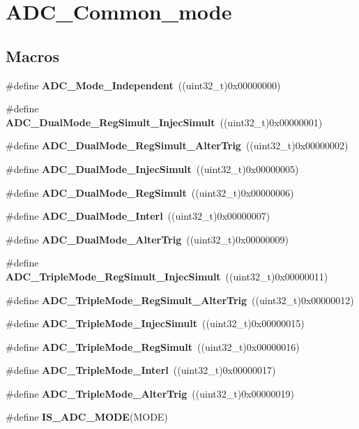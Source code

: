 \section{A\+D\+C\+\_\+\+Common\+\_\+mode}
\label{group__ADC__Common__mode}
\subsection*{Macros}
\begin{DoxyCompactItemize}
\item 
\#define \textbf{ A\+D\+C\+\_\+\+Mode\+\_\+\+Independent}~((uint32\+\_\+t)0x00000000)
\item 
\#define \textbf{ A\+D\+C\+\_\+\+Dual\+Mode\+\_\+\+Reg\+Simult\+\_\+\+Injec\+Simult}~((uint32\+\_\+t)0x00000001)
\item 
\#define \textbf{ A\+D\+C\+\_\+\+Dual\+Mode\+\_\+\+Reg\+Simult\+\_\+\+Alter\+Trig}~((uint32\+\_\+t)0x00000002)
\item 
\#define \textbf{ A\+D\+C\+\_\+\+Dual\+Mode\+\_\+\+Injec\+Simult}~((uint32\+\_\+t)0x00000005)
\item 
\#define \textbf{ A\+D\+C\+\_\+\+Dual\+Mode\+\_\+\+Reg\+Simult}~((uint32\+\_\+t)0x00000006)
\item 
\#define \textbf{ A\+D\+C\+\_\+\+Dual\+Mode\+\_\+\+Interl}~((uint32\+\_\+t)0x00000007)
\item 
\#define \textbf{ A\+D\+C\+\_\+\+Dual\+Mode\+\_\+\+Alter\+Trig}~((uint32\+\_\+t)0x00000009)
\item 
\#define \textbf{ A\+D\+C\+\_\+\+Triple\+Mode\+\_\+\+Reg\+Simult\+\_\+\+Injec\+Simult}~((uint32\+\_\+t)0x00000011)
\item 
\#define \textbf{ A\+D\+C\+\_\+\+Triple\+Mode\+\_\+\+Reg\+Simult\+\_\+\+Alter\+Trig}~((uint32\+\_\+t)0x00000012)
\item 
\#define \textbf{ A\+D\+C\+\_\+\+Triple\+Mode\+\_\+\+Injec\+Simult}~((uint32\+\_\+t)0x00000015)
\item 
\#define \textbf{ A\+D\+C\+\_\+\+Triple\+Mode\+\_\+\+Reg\+Simult}~((uint32\+\_\+t)0x00000016)
\item 
\#define \textbf{ A\+D\+C\+\_\+\+Triple\+Mode\+\_\+\+Interl}~((uint32\+\_\+t)0x00000017)
\item 
\#define \textbf{ A\+D\+C\+\_\+\+Triple\+Mode\+\_\+\+Alter\+Trig}~((uint32\+\_\+t)0x00000019)
\item 
\#define \textbf{ I\+S\+\_\+\+A\+D\+C\+\_\+\+M\+O\+DE}(M\+O\+DE)
\end{DoxyCompactItemize}


